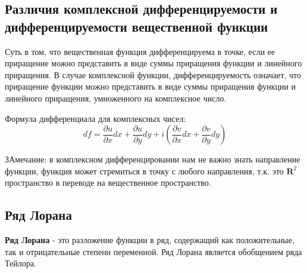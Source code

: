 \documentclass[a4paper,12pt]{article}
\begin{document}

\subsection{Различия комплексной дифференцируемости и дифференцируемости вещественной
    функции}
Суть в том, что вещественная функция дифференцируема в точке, если ее приращение
можно представить в виде суммы приращения функции и линейного приращения. В случае
комплексной функции, дифференцируемость означает, что приращение функции можно
представить в виде суммы приращения функции и линейного приращения, умноженного на
комплексное число.

Формула дифференциала для комплексных чисел:
\begin{equation*}
    df = \frac{\partial u}{\partial x} dx + \frac{\partial u}{\partial y} dy + 
    i\left(\frac{\partial v}{\partial x} dx + \frac{\partial v}{\partial y} dy\right)
\end{equation*}

ЗАмечание: в комплексном дифференцировании нам не важно знать направление функции,
функция может стремиться в точку с любого направления, т.к. это \(\mathbf{R}^2\) 
пространство в переводе на вещественное пространство.

\subsection{Ряд Лорана}
\textbf{Ряд Лорана} - это разложение функции в ряд, содержащий как положительные, так и
отрицательные степени переменной. Ряд Лорана является обобщением ряда Тейлора.
\end{document}
